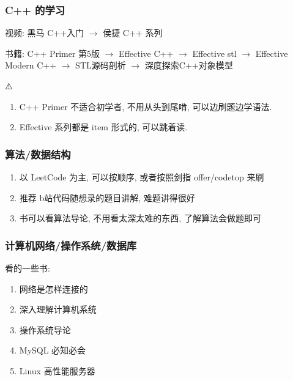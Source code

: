 \documentclass{ctexbeamer}
\begin{document}
\begin{frame}
	\frametitle{C++ 的学习}

	视频: 黑马 C++入门 $\longrightarrow$ 侯捷 C++ 系列

	书籍: C++ Primer 第5版  $\longrightarrow$  Effective C++  $\longrightarrow$ Effective stl  $\longrightarrow$ Effective Modern C++ $\longrightarrow$  STL源码剖析 $\longrightarrow$  深度探索C++对象模型

	\begin{exampleblock}{⚠️}
		\begin{enumerate}
			\item C++ Primer 不适合初学者, 不用从头到尾啃, 可以边刷题边学语法. 
			\item Effective 系列都是 item 形式的, 可以跳着读. 
		\end{enumerate}
		
	\end{exampleblock}
\end{frame}

\begin{frame}
	\frametitle{算法/数据结构}

	\begin{enumerate}
		\item 以 LeetCode 为主, 可以按顺序, 或者按照剑指 offer/codetop 来刷
		\item 推荐 b站代码随想录的题目讲解, 难题讲得很好
		\item 书可以看算法导论, 不用看太深太难的东西, 了解算法会做题即可
	\end{enumerate}

\end{frame}

\begin{frame}
	\frametitle{计算机网络/操作系统/数据库}
	看的一些书: 
	\begin{enumerate}
		\item 网络是怎样连接的
		\item 深入理解计算机系统
		\item 操作系统导论
		\item MySQL 必知必会
		\item Linux 高性能服务器
	\end{enumerate}

\end{frame}
\end{document}
